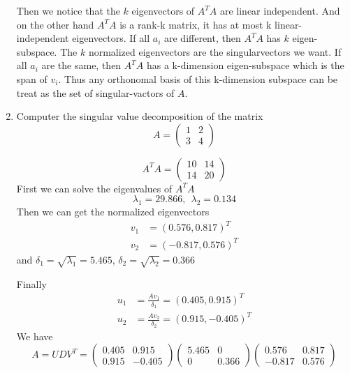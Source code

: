 \documentclass[a4paper, 12pt]{mcshw}
\begin{document}
\begin{enumerate}
\begin{solution}
            Then we notice that the $k$ eigenvectors of $A^TA$ are linear independent. And on the other hand $A^TA$ is a rank-k matrix, it has at most k linear-independent eigenvectors. If all $a_i$ are different, then $A^TA$ has $k$ eigen-subspace. The $k$ normalized eigenvectors are the singularvectors we want. If all $a_i$ are the same, then $A^TA$ has a k-dimension eigen-subspace which is the span of $v_i$. Thus any orthonomal basis of this k-dimension subspace can be treat as the set of singular-vactors of $A$.
        \end{solution}
    \item Computer the singular value decomposition of the matrix
        $$A = \left( 
        \begin{array}{cc}
            1 & 2\\
            3 & 4
        \end{array}
        \right)
        $$ 
        \begin{solution}
            $$A^TA = \left(
            \begin{array}{cc}
                10 & 14\\
                14 & 20
            \end{array}
            \right)
            $$
            First we can solve the eigenvalues of $A^TA$
            $$\lambda_1 = 29.866,\ \  \lambda_2 = 0.134$$
            Then we can get the normalized eigenvectors
            \begin{align*}
            v_1 &= (0.576, 0.817)^T\\
            v_2 &= (-0.817, 0.576)^T
            \end{align*}
            and $\delta_1 = \sqrt{\lambda_1} = 5.465$, $\delta_2 = \sqrt{\lambda_2} = 0.366$

            Finally 
            \begin{align*}
                u_1 &= \frac{Av_1}{\delta_1} = (0.405, 0.915)^T\\
                u_2 &= \frac{Av_2}{\delta_2} = (0.915, -0.405)^T
            \end{align*}
            We have
            $$A = UDV^T = 
            \left(
            \begin{array}{cc}
                0.405 & 0.915\\
                0.915 & -0.405
            \end{array}
            \right)
            \left(
            \begin{array}{cc}
                5.465 & 0\\
                0 & 0.366
            \end{array}
            \right)
            \left(
            \begin{array}{cc}
                0.576 & 0.817\\
                -0.817 & 0.576
            \end{array}
            \right)
            $$
        \end{solution}
\end{enumerate}
\end{document}
